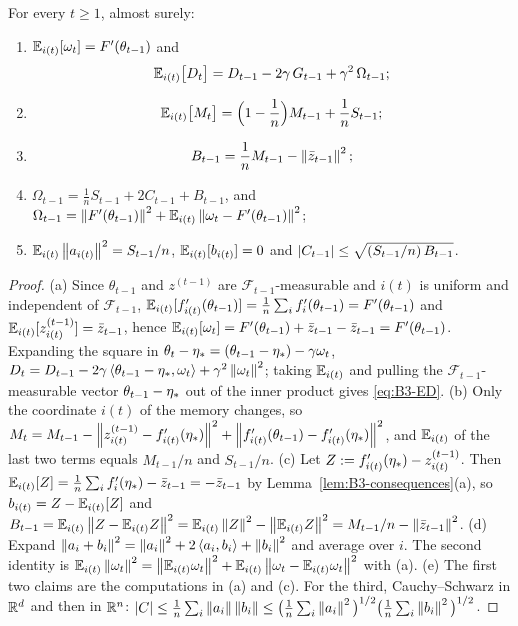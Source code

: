 \begin{lemma}\label{lem:B3-identities}
For every $t\ge1$, almost surely:
\begin{enumerate}[label=(\alph*)]
\item $\mathbb{E}_{i(t)}[\omega_t]=F'(\theta_{t-1})$ and
\begin{equation}\label{eq:B3-ED}
\mathbb{E}_{i(t)}\big[D_t\big]=D_{t-1}-2\gamma\,G_{t-1}+\gamma^2\,\Omega_{t-1};
\end{equation}
\item \begin{equation}\label{eq:B3-EM}
\mathbb{E}_{i(t)}\big[M_t\big]=\Big(1-\frac1n\Big)M_{t-1}+\frac1n S_{t-1};
\end{equation}
\item \begin{equation}\label{eq:B3-B}
B_{t-1}=\frac1n M_{t-1}-\left\|\bar z_{t-1}\right\|^2;
\end{equation}
\item $\Omega_{t-1}=\frac1n S_{t-1}+2C_{t-1}+B_{t-1}$, and $\Omega_{t-1}=\left\|F'(\theta_{t-1})\right\|^2+\mathbb{E}_{i(t)}\left\|\omega_t-F'(\theta_{t-1})\right\|^2$;
\item $\mathbb{E}_{i(t)}\left\|a_{i(t)}\right\|^2=S_{t-1}/n$, $\mathbb{E}_{i(t)}[b_{i(t)}]=0$ and $\left|C_{t-1}\right|\le\sqrt{(S_{t-1}/n)\,B_{t-1}}$.
\end{enumerate}
\end{lemma}
\begin{proof}
(a) Since $\theta_{t-1}$ and $z^{(t-1)}$ are $\mathcal F_{t-1}$-measurable and $i(t)$ is uniform and independent of $\mathcal F_{t-1}$, $\mathbb{E}_{i(t)}[f'_{i(t)}(\theta_{t-1})]=\frac1n\sum_if'_i(\theta_{t-1})=F'(\theta_{t-1})$ and $\mathbb{E}_{i(t)}[z^{(t-1)}_{i(t)}]=\bar z_{t-1}$, hence $\mathbb{E}_{i(t)}[\omega_t]=F'(\theta_{t-1})+\bar z_{t-1}-\bar z_{t-1}=F'(\theta_{t-1})$. Expanding the square in $\theta_t-\eta_\ast=(\theta_{t-1}-\eta_\ast)-\gamma\omega_t$,
$D_t=D_{t-1}-2\gamma\left\langle \theta_{t-1}-\eta_\ast, \omega_t \right\rangle+\gamma^2\left\|\omega_t\right\|^2$; taking $\mathbb{E}_{i(t)}$ and pulling the $\mathcal F_{t-1}$-measurable vector $\theta_{t-1}-\eta_\ast$ out of the inner product gives \eqref{eq:B3-ED}.
(b) Only the coordinate $i(t)$ of the memory changes, so
$M_t=M_{t-1}-\left\|z^{(t-1)}_{i(t)}-f'_{i(t)}(\eta_\ast)\right\|^2+\left\|f'_{i(t)}(\theta_{t-1})-f'_{i(t)}(\eta_\ast)\right\|^2$, and $\mathbb{E}_{i(t)}$ of the last two terms equals $M_{t-1}/n$ and $S_{t-1}/n$.
(c) Let $Z:=f'_{i(t)}(\eta_\ast)-z^{(t-1)}_{i(t)}$. Then $\mathbb{E}_{i(t)}[Z]=\frac1n\sum_if'_i(\eta_\ast)-\bar z_{t-1}=-\bar z_{t-1}$ by Lemma~\ref{lem:B3-consequences}(a), so $b_{i(t)}=Z-\mathbb{E}_{i(t)}[Z]$ and $B_{t-1}=\mathbb{E}_{i(t)}\left\|Z-\mathbb{E}_{i(t)} Z\right\|^2=\mathbb{E}_{i(t)}\left\|Z\right\|^2-\left\|\mathbb{E}_{i(t)} Z\right\|^2=M_{t-1}/n-\left\|\bar z_{t-1}\right\|^2$.
(d) Expand $\left\|a_i+b_i\right\|^2=\left\|a_i\right\|^2+2\left\langle a_i, b_i \right\rangle+\left\|b_i\right\|^2$ and average over $i$. The second identity is $\mathbb{E}_{i(t)}\left\|\omega_t\right\|^2=\left\|\mathbb{E}_{i(t)}\omega_t\right\|^2+\mathbb{E}_{i(t)}\left\|\omega_t-\mathbb{E}_{i(t)}\omega_t\right\|^2$ with (a).
(e) The first two claims are the computations in (a) and (c). For the third, Cauchy--Schwarz in $\mathbb{R}^d$ and then in $\mathbb{R}^n$:
$\left|C\right|\le\frac1n\sum_i\left\|a_i\right\|\left\|b_i\right\|\le\big(\frac1n\sum_i\left\|a_i\right\|^2\big)^{1/2}\big(\frac1n\sum_i\left\|b_i\right\|^2\big)^{1/2}$.
\end{proof}

